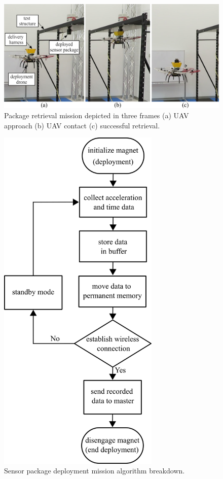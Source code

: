 \documentclass[]{spie}  %
\begin{document}
	\begin{figure} [H]
		\centering
		\includegraphics[width=6in]{figures/UAV deployment.png}
		\caption{Package retrieval mission depicted in three frames (a) UAV approach (b) UAV contact (c) successful retrieval.}
		\label{fig:UAV_deployment} 
	\end{figure}


	\begin{figure} [H]
		\centering
		\includegraphics[height=17cm]{figures/Code FlowChart.png}
		\caption{Sensor package deployment mission algorithm breakdown.}
		\label{fig:Code FlowChart} 
	\end{figure}
	
\end{document}
